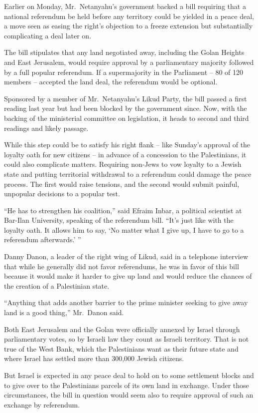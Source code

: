 ﻿\documentclass[12pt]{article}
\begin{document}
Earlier on Monday, Mr.~Netanyahu's government backed a bill requiring that a national referendum be
held before any territory could be yielded in a peace deal, a move seen as easing the right's
objection to a freeze extension but substantially complicating a deal later on.

The bill stipulates that any land negotiated away, including the Golan Heights and East Jerusalem,
would require approval by a parliamentary majority followed by a full popular referendum. If a
supermajority in the Parliament -- 80 of 120 members -- accepted the land deal, the referendum would
be optional.

Sponsored by a member of Mr.~Netanyahu's Likud Party, the bill passed a first reading last year but
had been blocked by the government since. Now, with the backing of the ministerial committee on
legislation, it heads to second and third readings and likely passage.

While this step could be to satisfy his right flank -- like Sunday's approval of the loyalty oath
for new citizens -- in advance of a concession to the Palestinians, it could also complicate
matters. Requiring non-Jews to vow loyalty to a Jewish state and putting territorial withdrawal to a
referendum could damage the peace process. The first would raise tensions, and the second would
submit painful, unpopular decisions to a popular test.

``He has to strengthen his coalition,'' said Efraim Inbar, a political scientist at Bar-Ilan
University, speaking of the referendum bill. ``It's just like with the loyalty oath. It allows him
to say, `No matter what I give up, I have to go to a referendum afterwards.' ''

Danny Danon, a leader of the right wing of Likud, said in a telephone interview that while he
generally did not favor referendums, he was in favor of this bill because it would make it harder to
give up land and would reduce the chances of the creation of a Palestinian state.

``Anything that adds another barrier to the prime minister seeking to give away land is a good
thing,'' Mr.~Danon said.

Both East Jerusalem and the Golan were officially annexed by Israel through parliamentary votes, so
by Israeli law they count as Israeli territory. That is not true of the West Bank, which the
Palestinians want as their future state and where Israel has settled more than 300,000 Jewish
citizens.

But Israel is expected in any peace deal to hold on to some settlement blocks and to give over to
the Palestinians parcels of its own land in exchange. Under those circumstances, the bill in
question would seem also to require approval of such an exchange by referendum.
\end{document}
